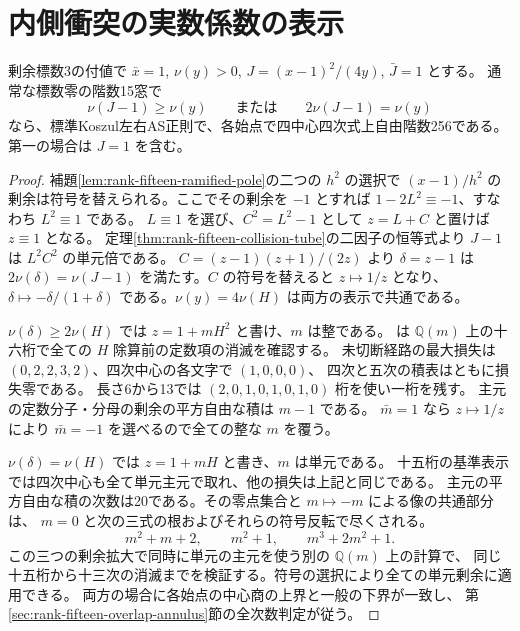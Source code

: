 \section{内側衝突の実数係数の表示}
\label{sec:rank-fifteen-inner-collision}
\begin{theorem}\label{thm:rank-fifteen-inner-collision}
剰余標数3の付値で $\bar x=1$, $\nu(y)>0$, $J=(x-1)^2/(4y)$, $\bar J=1$ とする。
通常な標数零の階数15窓で
\[
       \nu(J-1)\ge\nu(y) \qquad\text{または}\qquad
       2\nu(J-1)=\nu(y)
\]
なら、標準Koszul左右AS正則で、各始点で四中心四次式上自由階数256である。
第一の場合は $J=1$ を含む。
\end{theorem}
\begin{proof}
補題\ref{lem:rank-fifteen-ramified-pole}の二つの $h^2$ の選択で
$(x-1)/h^2$ の剰余は符号を替えられる。ここでその剰余を $-1$ とすれば
$1-2L^2\equiv-1$、すなわち $L^2\equiv1$ である。
$L\equiv1$ を選び、$C^2=L^2-1$ として $z=L+C$ と置けば $z\equiv1$ となる。
定理\ref{thm:rank-fifteen-collision-tube}の二因子の恒等式より
$J-1$ は $L^2 C^2$ の単元倍である。
$C=(z-1)(z+1)/(2z)$ より $\delta=z-1$ は
$2\nu(\delta)=\nu(J-1)$ を満たす。$C$ の符号を替えると $z\mapsto1/z$ となり、
$\delta\mapsto-\delta/(1+\delta)$ である。$\nu(y)=4\nu(H)$ は両方の表示で共通である。

$\nu(\delta)\ge2\nu(H)$ では $z=1+mH^2$ と書け、$m$ は整である。
 は
$\mathbb Q(m)$ 上の十六桁で全ての $H$ 除算前の定数項の消滅を確認する。
未切断経路の最大損失は $(0,2,2,3,2)$、四次中心の各文字で $(1,0,0,0)$、
四次と五次の積表はともに損失零である。
長さ6から13では $(2,0,1,0,1,0,1,0)$ 桁を使い一桁を残す。
主元の定数分子・分母の剰余の平方自由な積は $m-1$ である。
$\bar m=1$ なら $z\mapsto1/z$ により $\bar m=-1$ を選べるので全ての整な $m$ を覆う。

$\nu(\delta)=\nu(H)$ では $z=1+mH$ と書き、$m$ は単元である。
十五桁の基準表示では四次中心も全て単元主元で取れ、他の損失は上記と同じである。
主元の平方自由な積の次数は20である。その零点集合と $m\mapsto-m$ による像の共通部分は、
$m=0$ と次の三式の根およびそれらの符号反転で尽くされる。
\[
           m^2+m+2,\qquad m^2+1,\qquad m^3+2m^2+1 .
\]
この三つの剰余拡大で同時に単元の主元を使う別の $\mathbb Q(m)$ 上の計算で、
同じ十五桁から十三次の消滅までを検証する。符号の選択により全ての単元剰余に適用できる。
両方の場合に各始点の中心商の上界と一般の下界が一致し、
第\ref{sec:rank-fifteen-overlap-annulus}節の全次数判定が従う。
\end{proof}

